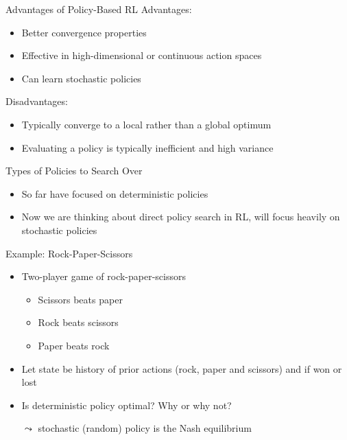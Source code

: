 \documentclass[aspectratio=169]{../latex_main/tntbeamer}  %
\begin{document}
\begin{frame}[c]{Advantages of Policy-Based RL}
Advantages:
\begin{itemize}
    \item Better convergence properties
    \item Effective in high-dimensional or continuous action spaces
    \item Can learn stochastic policies
\end{itemize}

\pause
\bigskip
Disadvantages:
\begin{itemize}
    \item Typically converge to a local rather than a global optimum
    \item Evaluating a policy is typically inefficient and high variance
\end{itemize}

\end{frame}
\begin{frame}[c]{Types of Policies to Search Over}
	
\begin{itemize}
	\item So far have focused on deterministic policies
	\item Now we are thinking about direct policy search in RL, will focus
	heavily on stochastic policies
\end{itemize}

\end{frame}
\begin{frame}[c]{Example: Rock-Paper-Scissors}
	
	\begin{itemize}
		\item Two-player game of rock-paper-scissors
		\begin{itemize}
			\item Scissors beats paper
			\item Rock beats scissors
			\item Paper beats rock
		\end{itemize}
		\item Let state be history of prior actions (rock, paper and scissors) and if
		won or lost
		\item Is deterministic policy optimal? Why or why not?
		\pause
		\item[$\leadsto$] stochastic (random) policy is the Nash equilibrium
	\end{itemize}

	
\end{frame}
\end{document}
